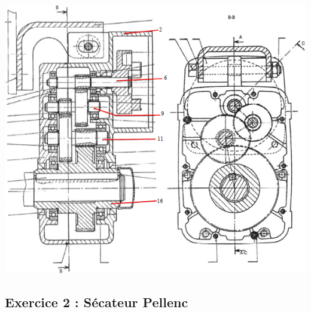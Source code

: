 \documentclass[10pt,oneside]{article}
\begin{document}




\begin{center}
 \includegraphics[width=.9\textwidth]{png/demag2}
\end{center}

\subsection*{Exercice 2 : Sécateur Pellenc}
\setcounter{subparagraph}{0}
\end{document}
